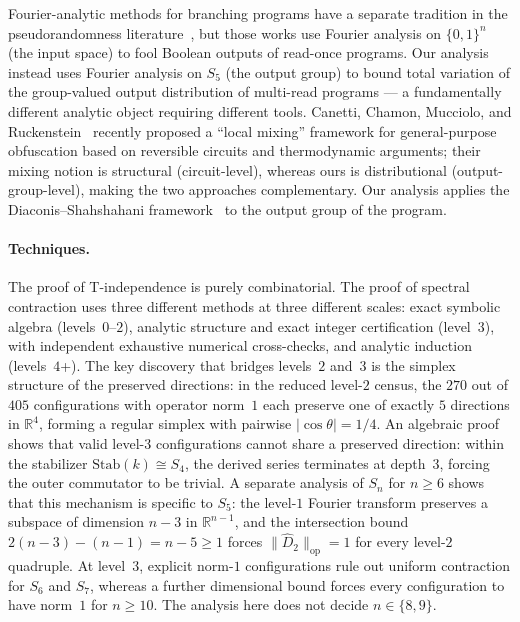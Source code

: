 \documentclass[version=final]{iacrcc}
\newcommand{\norm}[1]{\lVert #1 \rVert}
\newcommand{\abs}[1]{\lvert #1 \rvert}
\newcommand{\opn}[1]{\norm{#1}_{\mathrm{op}}}
\newcommand{\Dhat}{\widehat{D}}
\begin{document}
Fourier-analytic methods for branching programs have a separate tradition
in the pseudorandomness literature~\cite{RSV13,LPV22}, but those
works use Fourier analysis on $\{0,1\}^n$ (the input space) to fool
Boolean outputs of read-once programs.  Our analysis instead uses Fourier
analysis on $S_5$ (the output group) to bound total variation of the
group-valued output distribution of multi-read programs --- a fundamentally
different analytic object requiring different tools.
Canetti, Chamon, Mucciolo, and Ruckenstein~\cite{CCMR24} recently proposed a ``local mixing''
framework for general-purpose obfuscation based on reversible circuits and
thermodynamic arguments; their mixing notion is structural (circuit-level),
whereas ours is distributional (output-group-level), making the two
approaches complementary. Our analysis applies the Diaconis--Shahshahani
framework~\cite{DS81} to the output group of the program.

\paragraph{Techniques.}
The proof of T-independence is purely combinatorial. The proof of spectral
contraction uses three different methods at three different scales:
exact symbolic algebra (levels~$0$--$2$), analytic structure and exact integer
certification (level~$3$), with independent exhaustive numerical cross-checks,
and analytic induction (levels~$4$+). The key discovery
that bridges levels~$2$ and~$3$ is the simplex structure of the
preserved directions: in the reduced level-$2$ census, the $270$ out of $405$
configurations with operator norm~$1$ each preserve one of exactly $5$ directions in
$\mathbb{R}^4$, forming a regular simplex with pairwise $\abs{\cos\theta} = 1/4$.
An algebraic proof shows that valid level-$3$ configurations cannot share a
preserved direction: within the stabilizer $\mathrm{Stab}(k) \cong S_4$,
the derived series terminates at depth~$3$, forcing the outer commutator to be
trivial. A separate analysis of $S_n$ for $n \geq 6$ shows that this mechanism
is specific to $S_5$: the level-$1$ Fourier transform preserves a subspace of
dimension $n-3$ in $\mathbb{R}^{n-1}$, and the intersection bound
$2(n-3)-(n-1) = n-5 \geq 1$ forces $\opn{\Dhat_2} = 1$ for every level-$2$
quadruple. At level~$3$, explicit norm-$1$ configurations rule out uniform
contraction for $S_6$ and $S_7$, whereas a further dimensional bound forces
every configuration to have norm~$1$ for $n \geq 10$. The analysis here does
not decide $n \in \{8,9\}$.
\end{document}
